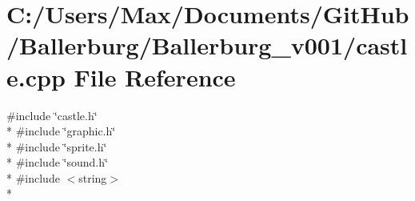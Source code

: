 \section{C\+:/\+Users/\+Max/\+Documents/\+Git\+Hub/\+Ballerburg/\+Ballerburg\+\_\+v001/castle.cpp File Reference}
\label{castle_8cpp}
{\ttfamily \#include \char`\"{}castle.\+h\char`\"{}}\\*
{\ttfamily \#include \char`\"{}graphic.\+h\char`\"{}}\\*
{\ttfamily \#include \char`\"{}sprite.\+h\char`\"{}}\\*
{\ttfamily \#include \char`\"{}sound.\+h\char`\"{}}\\*
{\ttfamily \#include $<$string$>$}\\*
